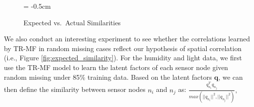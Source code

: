 \begin{figure}[h]
\vspace{-0.2cm}
\subfigcapmargin = -0.5cm
\hspace{0.1cm}
\hspace{0.1cm}
\vspace{-0.3cm}
\caption{Expected vs.~Actual Similarities}
\label{fig:similarity}
\vspace{-0.3cm}
\end{figure}


We also conduct an interesting experiment to see whether the correlations learned by TR-MF in random missing cases reflect our hypothesis of spatial correlation (i.e., Figure \ref{fig:expected_similarity}).
For the humidity and light data, we first use the TR-MF model to learn the latent factors of each sensor node given random missing under 85\% training data.
Based on the latent factors $\mathbf{q}$, we can then define the similarity between sensor nodes $n_i$ and $n_j$ as:
$\frac{q_{n_i}^T q_{n_j}}{max(||q_{n_i}||^2, ||q_{n_j}||^2)},$

